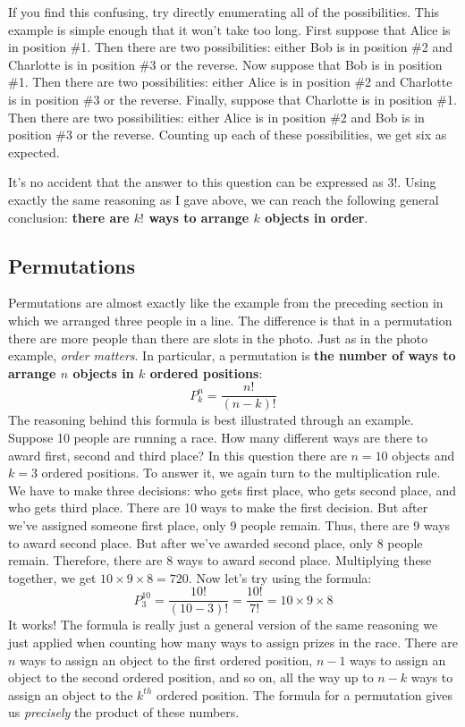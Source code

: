 \documentclass[12pt]{article}
\begin{document}
If you find this confusing, try directly enumerating all of the possibilities.
This example is simple enough that it won't take too long.
First suppose that Alice is in position \#1.
Then there are two possibilities: either Bob is in position \#2 and Charlotte is in position \#3 or the reverse.
Now suppose that Bob is in position \#1.
Then there are two possibilities: either Alice is in position \#2 and Charlotte is in position \#3 or the reverse.
Finally, suppose that Charlotte is in position \#1.
Then there are two possibilities: either Alice is in position \#2 and Bob is in position \#3 or the reverse.
Counting up each of these possibilities, we get six as expected.

It's no accident that the answer to this question can be expressed as $3!$.
Using exactly the same reasoning as I gave above, we can reach the following general conclusion: \textbf{there are $k!$ ways to arrange $k$ objects in order}.

\subsection*{Permutations}
Permutations are almost exactly like the example from the preceding section in which we arranged three people in a line.
The difference is that in a permutation there are more people than there are slots in the photo.
Just as in the photo example, \emph{order matters}.
In particular, a permutation is \textbf{the number of ways to arrange $n$ objects in $k$ ordered positions}:
\begin{equation*}
  P^n_k = \frac{n!}{\left( n-k \right)!}
\end{equation*}
The reasoning behind this formula is best illustrated through an example.
Suppose 10 people are running a race.
How many different ways are there to award first, second and third place?
In this question there are $n=10$ objects and $k=3$ ordered positions.
To answer it, we again turn to the multiplication rule.
We have to make three decisions: who gets first place, who gets second place, and who gets third place.
There are 10 ways to make the first decision.
But after we've assigned someone first place, only 9 people remain.
Thus, there are 9 ways to award second place.
But after we've awarded second place, only 8 people remain.
Therefore, there are 8 ways to award second place.
Multiplying these together, we get $10 \times 9 \times 8 = 720$.
Now let's try using the formula:
\begin{equation*}
  P^{10}_{3} = \frac{10!}{\left( 10-3 \right)!} = \frac{10!}{7!}= 10 \times 9 \times 8
\end{equation*}
It works!
The formula is really just a general version of the same reasoning we just applied when counting how many ways to assign prizes in the race.
There are $n$ ways to assign an object to the first ordered position, $n-1$ ways to assign an object to the second ordered position, and so on, all the way up to $n-k$ ways to assign an object to the $k^{th}$ ordered position.
The formula for a permutation gives us \emph{precisely} the product of these numbers.
\end{document}
